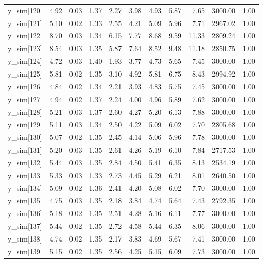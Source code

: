 \begin{table}[ht]
\begin{tabular}{rrrrrrrrrrr}
  y\_sim[120] & 4.92 & 0.03 & 1.37 & 2.27 & 3.98 & 4.93 & 5.87 & 7.65 & 3000.00 & 1.00 \\ 
  y\_sim[121] & 5.10 & 0.02 & 1.33 & 2.55 & 4.21 & 5.09 & 5.96 & 7.71 & 2967.02 & 1.00 \\ 
  y\_sim[122] & 8.70 & 0.03 & 1.34 & 6.15 & 7.77 & 8.68 & 9.59 & 11.33 & 2809.24 & 1.00 \\ 
  y\_sim[123] & 8.54 & 0.03 & 1.35 & 5.87 & 7.64 & 8.52 & 9.48 & 11.18 & 2850.75 & 1.00 \\ 
  y\_sim[124] & 4.72 & 0.03 & 1.40 & 1.93 & 3.77 & 4.73 & 5.65 & 7.45 & 3000.00 & 1.00 \\ 
  y\_sim[125] & 5.81 & 0.02 & 1.35 & 3.10 & 4.92 & 5.81 & 6.75 & 8.43 & 2994.92 & 1.00 \\ 
  y\_sim[126] & 4.84 & 0.02 & 1.34 & 2.21 & 3.93 & 4.83 & 5.75 & 7.45 & 3000.00 & 1.00 \\ 
  y\_sim[127] & 4.94 & 0.02 & 1.37 & 2.24 & 4.00 & 4.96 & 5.89 & 7.62 & 3000.00 & 1.00 \\ 
  y\_sim[128] & 5.21 & 0.03 & 1.37 & 2.60 & 4.27 & 5.20 & 6.13 & 7.88 & 3000.00 & 1.00 \\ 
  y\_sim[129] & 5.11 & 0.03 & 1.34 & 2.50 & 4.22 & 5.09 & 6.02 & 7.70 & 2805.68 & 1.00 \\ 
  y\_sim[130] & 5.07 & 0.02 & 1.35 & 2.45 & 4.14 & 5.06 & 5.96 & 7.78 & 3000.00 & 1.00 \\ 
  y\_sim[131] & 5.20 & 0.03 & 1.35 & 2.61 & 4.26 & 5.19 & 6.10 & 7.84 & 2717.53 & 1.00 \\ 
  y\_sim[132] & 5.44 & 0.03 & 1.35 & 2.84 & 4.50 & 5.41 & 6.35 & 8.13 & 2534.19 & 1.00 \\ 
  y\_sim[133] & 5.33 & 0.03 & 1.33 & 2.73 & 4.45 & 5.29 & 6.21 & 8.01 & 2640.50 & 1.00 \\ 
  y\_sim[134] & 5.09 & 0.02 & 1.36 & 2.41 & 4.20 & 5.08 & 6.02 & 7.70 & 3000.00 & 1.00 \\ 
  y\_sim[135] & 4.75 & 0.03 & 1.35 & 2.18 & 3.84 & 4.74 & 5.64 & 7.43 & 2792.35 & 1.00 \\ 
  y\_sim[136] & 5.18 & 0.02 & 1.35 & 2.51 & 4.28 & 5.16 & 6.11 & 7.77 & 3000.00 & 1.00 \\ 
  y\_sim[137] & 5.44 & 0.02 & 1.35 & 2.72 & 4.58 & 5.44 & 6.35 & 8.06 & 3000.00 & 1.00 \\ 
  y\_sim[138] & 4.74 & 0.02 & 1.35 & 2.17 & 3.83 & 4.69 & 5.67 & 7.41 & 3000.00 & 1.00 \\ 
  y\_sim[139] & 5.15 & 0.02 & 1.35 & 2.56 & 4.25 & 5.15 & 6.09 & 7.73 & 3000.00 & 1.00 \\ 

\end{tabular}
\end{table}
